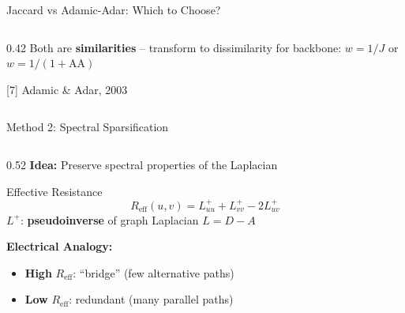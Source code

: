 \documentclass[aspectratio=169]{beamer}
\begin{document}
\begin{frame}[shrink=12]{\faBalanceScale \quad Jaccard vs Adamic-Adar: Which to Choose?}
\begin{columns}[T]
\begin{column}{0.42\textwidth}
            \vspace{0.1cm}
            {\footnotesize\textcolor{goldaccent}{Both are \textbf{similarities}} -- transform to dissimilarity for backbone: $w = 1/J$ or $w = 1/(1+\mathrm{AA})$}

            \vspace{0.05cm}
            {\scriptsize\textcolor{distillgrey}{[7] Adamic \& Adar, 2003}}
        \end{column}
    \end{columns}
\end{frame}

\begin{frame}[shrink=5]{\faWaveSquare \quad Method 2: Spectral Sparsification}
    \begin{columns}[T]
        \begin{column}{0.52\textwidth}
            \textbf{\textcolor{cyanneon}{Idea:}} Preserve spectral properties of the Laplacian

            \begin{exampleblock}{\faLightbulb \quad Effective Resistance}
                \[
                R_{\text{eff}}(u,v) = L^+_{uu} + L^+_{vv} - 2L^+_{uv}
                \]
                {\small $L^+$: \textbf{pseudoinverse} of graph Laplacian $L = D - A$}
            \end{exampleblock}

            \vspace{0.1cm}
            \textbf{\textcolor{cyanneon}{\faBolt \quad Electrical Analogy:}}
            \begin{itemize}\setlength{\itemsep}{0pt}
                \item \textbf{High} $R_{\text{eff}}$: ``bridge'' (few alternative paths)
                \item \textbf{Low} $R_{\text{eff}}$: redundant (many parallel paths)
            \end{itemize}


\end{column}
\end{columns}
\end{frame}
\end{document}
